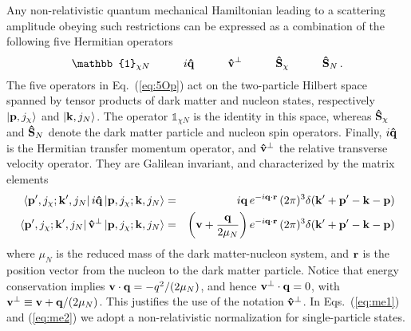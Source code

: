 \documentclass[11pt,a4paper]{article}
\begin{document}
Any non-relativistic quantum mechanical Hamiltonian leading to a scattering amplitude obeying such restrictions can be expressed as a combination of the following five Hermitian operators
\begin{equation}
\mathbb{1}_{\chi N} \qquad\quad i{\bf{\hat{q}}} \qquad\quad {\bf{\hat{v}}}^{\perp} \qquad\quad {\bf{\hat{S}}}_{\chi} \qquad\quad {\bf{\hat{S}}}_{N}  \,.
\label{eq:5Op}
\end{equation}
The five operators in Eq.~(\ref{eq:5Op}) act on the two-particle Hilbert space spanned by tensor products of dark matter and nucleon
states, respectively $|{\bf p},j_\chi\rangle$ and $|{\bf k},j_N\rangle$.
The operator $\mathbb{1}_{\chi N}$ is the identity in this space, whereas ${\bf\hat{S}}_{\chi}$ and ${\bf\hat{S}}_{N}$ denote the dark matter particle and nucleon spin operators. Finally, $i{\bf{\hat{q}}}$ is the Hermitian transfer momentum operator, and ${\bf{\hat{v}^{\perp}}}$ the relative transverse velocity operator.
They are Galilean invariant, and characterized by the matrix elements 
\begin{eqnarray}
\label{eq:me1}
\langle {\bf p'},j_\chi;  {\bf k'},j_N| \,  i{\bf{\hat{q}}} \,|{\bf p},j_\chi;  {\bf k},j_N \rangle  &=& i {\bf q} \,e^{-i {\bf q} \cdot {\bf r}} \,(2\pi)^3\delta({\bf k'}+{\bf p'}-{\bf k}-{\bf p}) \\
\label{eq:me2}
\langle {\bf p'},j_\chi;  {\bf k'},j_N| \, {\bf{\hat{v}^{\perp}}} \, |{\bf{p}},j_\chi;  {\bf k},j_N \rangle  &=& \left({\bf v}+\frac{{\bf q}}{2\mu_N}\right) e^{-i {\bf q} \cdot {\bf r}} \,(2\pi)^3\delta({\bf k'}+{\bf p'}-{\bf k}-{\bf p})
\end{eqnarray} 
where $\mu_N$ is the reduced mass of the dark matter-nucleon system, and ${\bf r}$ is the position vector from the nucleon to the dark matter particle. 
Notice that energy conservation implies ${\bf v}\cdot{\bf q}=-q^2/(2\mu_N)$, and hence $ {\bf{v}^{\perp}}\cdot {\bf q}=0$, with ${\bf{v}^{\perp}} \equiv {\bf v}+{\bf q}/(2\mu_N)$. This justifies the use of the notation $\bf{\hat{v}^{\perp}}$. In Eqs.~(\ref{eq:me1}) and (\ref{eq:me2}) we adopt a non-relativistic normalization for single-particle states. 
\end{document}
